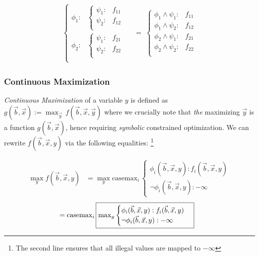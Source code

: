 \documentclass[twoside,11pt]{article}
\newcommand{\casemax}{\mathrm{casemax}}
\begin{document}
\begin{align*}
    \begin{cases}
      \phi_1: & 
        \begin{cases}
          \psi_1: & f_{11} \\ 
          \psi_2: & f_{12}  \\ 
        \end{cases} \\
      \phi_2: & 
        \begin{cases}
          \psi_1: & f_{21} \\ 
          \psi_2: & f_{22}  \\ 
        \end{cases} \\
    \end{cases} & \; = \;
        \begin{cases}
          \phi_1 \land \psi_1: & f_{11} \\ 
          \phi_1 \land \psi_2: & f_{12}  \\ 
          \phi_2 \land \psi_1: & f_{21} \\ 
          \phi_2 \land \psi_2: & f_{22}  \\ 
        \end{cases} 
\end{align*}

 
\subsubsection*{Continuous Maximization}
\emph{Continuous Maximization} of a variable $y$ is defined as $g(\vec{b},\vec{x}) := \max_{\vec{y}}
\, f(\vec{b},\vec{x},\vec{y})$ where we crucially note that 
\emph{the} maximizing $\vec{y}$ is a function
$g(\vec{b},\vec{x})$, hence requiring \emph{symbolic} 
constrained optimization.
We can rewrite $f(\vec{b},\vec{x},y)$ via 
the following equalities:
\footnote{The second line ensures that all illegal values are mapped to $-\infty$}

\begin{align}
\max_y f(\vec{b},\vec{x},y) & = 
\max_y \casemax_i \, \begin{cases}
\phi_i(\vec{b},\vec{x},y) : f_i(\vec{b},\vec{x},y) \nonumber \\
\neg \phi_i(\vec{b},\vec{x},y) : -\infty
\end{cases} 
\end{align} 
\begin{align}
& = \casemax_i \, \fbox{$\max_y \begin{cases}
\phi_i(\vec{b},\vec{x},y) : f_i(\vec{b},\vec{x},y) \\
\neg \phi_i(\vec{b},\vec{x},y) : -\infty
\end{cases}$} \label{eq:casemax_max}
\end{align} 
\end{document}
